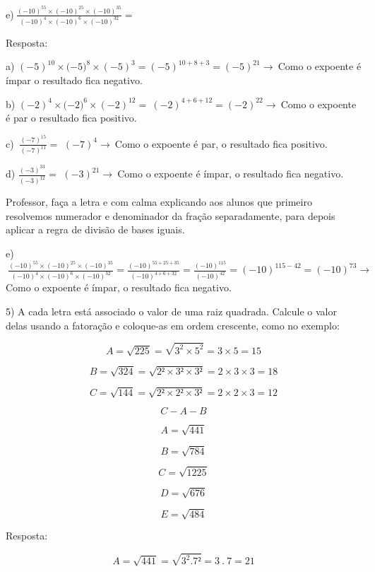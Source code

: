 e)\(\ \frac{{( - 10)}^{55} \times {( - 10)}^{25} \times {( - 10)}^{35}}{{( - 10)}^{4} \times {( - 10)}^{6} \times {( - 10)}^{32}} =\)

Resposta:

a)
\({( - 5)}^{10} \times ( - {5)}^{8} \times \left( - 5 \right)^{3} = \left( - 5 \right)^{10 + 8 + 3} = \left( - 5 \right)^{21} \rightarrow \ \)Como
o expoente é ímpar o resultado fica negativo.

b)
\({( - 2)}^{4} \times ( - {2)}^{6} \times \left( - 2 \right)^{12} = \ \left( - 2 \right)^{4 + 6 + 12} = \left( - 2 \right)^{22} \rightarrow \ \)Como
o expoente é par o resultado fica positivo.

c) \(\ \frac{{( - 7)}^{15}}{{( - 7)}^{11}} =\)
\({( - 7)}^{4} \rightarrow \ \)Como o expoente é par, o resultado fica
positivo.

d) \(\frac{{( - 3)}^{33}}{{( - 3)}^{12}} =\)
\({( - 3)}^{21} \rightarrow \ \)Como o expoente é ímpar, o resultado
fica negativo.

Professor, faça a letra e com calma explicando aos alunos que primeiro
resolvemos numerador e denominador da fração separadamente, para depois
aplicar a regra de divisão de bases iguais.

e)\(\ \frac{{( - 10)}^{55} \times {( - 10)}^{25} \times {( - 10)}^{35}}{{( - 10)}^{4} \times {( - 10)}^{6} \times {( - 10)}^{32}} = \frac{{( - 10)}^{55 + 25 + 35}}{{( - 10)}^{4 + 6 + 32}} = \frac{{( - 10)}^{115}}{{( - 10)}^{42}} = {( - 10)}^{115 - 42} = {( - 10)}^{73} \rightarrow \ \)Como
o expoente é ímpar, o resultado fica negativo.

5) A cada letra está associado o valor de uma raiz quadrada. Calcule o
valor delas usando a fatoração e coloque-as em ordem crescente, como no
exemplo:

\[A = \sqrt{225} = \sqrt{3^{2} \times 5^{2}} = 3 \times 5 = 15\]

\[B = \sqrt{324} = \sqrt{2² \times 3² \times 3²} = 2 \times 3 \times 3 = 18\]

\[C = \sqrt{144} = \sqrt{2² \times 2² \times 3²} = 2 \times 2 \times 3 = 12\]

\[C - A - B\]

\[A = \sqrt{441}\]

\[B = \sqrt{784}\]

\[C = \sqrt{1225}\]

\[D = \sqrt{676}\]

\[E = \sqrt{484}\]

Resposta:

\[A = \sqrt{441} = \sqrt{3^{2}.7²} = 3\ .\ 7 = 21\]

